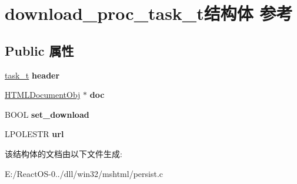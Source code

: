 \hypertarget{structdownload__proc__task__t}{}\section{download\+\_\+proc\+\_\+task\+\_\+t结构体 参考}
\label{structdownload__proc__task__t}
\subsection*{Public 属性}
\begin{DoxyCompactItemize}
\item 
\mbox{\label{structdownload__proc__task__t_a5735e62f10a9f4bc21f03755411a8099}} 
\hyperlink{structtask__t}{task\+\_\+t} {\bfseries header}
\item 
\mbox{\label{structdownload__proc__task__t_a0bda9e1bee54e70c0b68499e8ffb0d8d}} 
\hyperlink{struct_h_t_m_l_document_obj}{H\+T\+M\+L\+Document\+Obj} $\ast$ {\bfseries doc}
\item 
\mbox{\label{structdownload__proc__task__t_a6348bdb64f1814172271e2b4d6e2a921}} 
B\+O\+OL {\bfseries set\+\_\+download}
\item 
\mbox{\label{structdownload__proc__task__t_a466bc122126a84f2f9cae10071f7f7c4}} 
L\+P\+O\+L\+E\+S\+TR {\bfseries url}
\end{DoxyCompactItemize}


该结构体的文档由以下文件生成\+:\begin{DoxyCompactItemize}
\item 
E\+:/\+React\+O\+S-\/0../dll/win32/mshtml/persist.\+c\end{DoxyCompactItemize}
